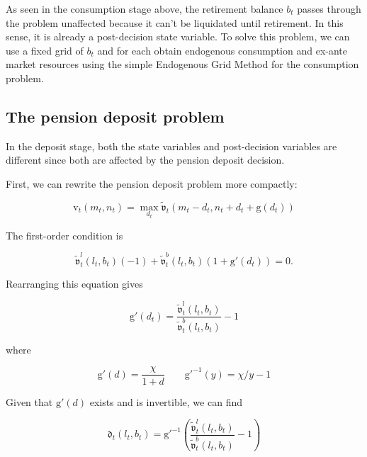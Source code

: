 \documentclass{article}
\newcommand{\bRat}{b}
\newcommand{\vFunc}{\mathrm{v}}
\newcommand{\mRat}{m}
\newcommand{\vOpt}{\tilde{\mathfrak{v}}}
\newcommand{\nRat}{n}
\newcommand{\dRat}{d}
\newcommand{\gFunc}{\mathrm{g}}
\newcommand{\xFer}{\chi}
\newcommand{\lRat}{l}
\newcommand{\dEndFunc}{\mathfrak{d}}
\begin{document}
As seen in the consumption stage above, the retirement balance $\bRat_{t}$ passes through the problem unaffected because it can't be liquidated until retirement. In this sense, it is already a post-decision state variable. To solve this problem, we can use a fixed grid of $\bRat_{t}$ and for each obtain endogenous consumption and ex-ante market resources using the simple Endogenous Grid Method for the consumption problem.

\subsection{The pension deposit problem}\label{The pension deposit problem}

In the deposit stage, both the state variables and post-decision variables are different since both are affected by the pension deposit decision.

First, we can rewrite the pension deposit problem more compactly:

\begin{equation}
\vFunc_{t}(\mRat_{t}, \nRat_{t}) = \max_{\dRat_{t}}
  \vOpt_{t}(\mRat_{t} - \dRat_{t}, \nRat_{t} + \dRat_{t} + \gFunc(\dRat_{t}))
\end{equation}

The first-order condition is

\begin{equation}
\vOpt_{t}^{\lRat}(\lRat_{t}, \bRat_{t})(-1) +
  \vOpt_{t}^{\bRat}(\lRat_{t}, \bRat_{t})(1+\gFunc'(\dRat_{t})) = 0.
\end{equation}

Rearranging this equation gives

\begin{equation}
\gFunc'(\dRat_{t}) = \frac{\vOpt_{t}^{\lRat}(\lRat_{t},
    \bRat_{t})}{\vOpt_{t}^{\bRat}(\lRat_{t}, \bRat_{t})} - 1
\end{equation}

where

\begin{equation}
\gFunc'(\dRat) =
  \frac{\xFer}{1+\dRat} \qquad \gFunc'^{-1}(y) = \xFer/y - 1
\end{equation}

Given that $\gFunc'(\dRat)$ exists and is invertible, we can find

\begin{equation}
\dEndFunc_{t}(\lRat_{t}, \bRat_{t}) = \gFunc'^{-1}\left(
  \frac{\vOpt_{t}^{\lRat}(\lRat_{t},
    \bRat_{t})}{\vOpt_{t}^{\bRat}(\lRat_{t},
    \bRat_{t})} - 1 \right)
\end{equation}
\end{document}
